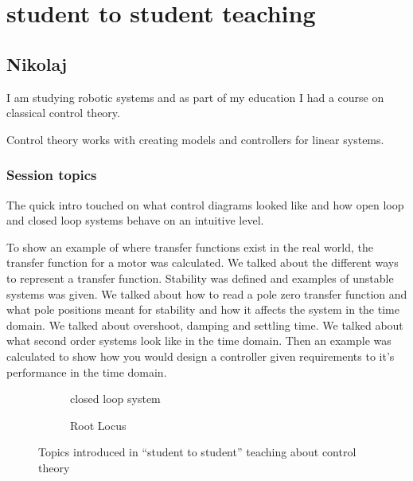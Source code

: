 \section{student to student teaching}
\subsection{Nikolaj}
I am studying robotic systems and as part of my education I had a course on classical control theory.

Control theory works with creating models and controllers for linear systems.
\subsubsection{Session topics}
The quick intro touched on what control diagrams looked like and how open loop and closed loop systems behave on an intuitive level.

To show an example of where transfer functions exist in the real world, the transfer function for a motor was calculated.
We talked about the different ways to represent a transfer function.
Stability was defined and examples of unstable systems was given.
We talked about how to read a pole zero transfer function and what pole positions meant for stability and how it affects the system in the time domain.
We talked about overshoot, damping and settling time.
We talked about what second order systems look like in the time domain.
Then an example was calculated to show how you would design a controller given requirements to it's performance in the time domain.

\begin{figure}[h]
\centering
\begin{subfigure}[c]{0.4\textwidth}
\centering
  \begin{tikzpicture}[node distance = 2 cm]
  
  \end{tikzpicture}
  \caption{closed loop system}
\end{subfigure}
\begin{subfigure}[c]{0.4\textwidth}
\centering
  \caption{Root Locus}
\end{subfigure}
\caption{Topics introduced in ``student to student'' teaching about control theory}
\end{figure}

